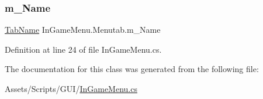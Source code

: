 \subsubsection{\texorpdfstring{m\+\_\+\+Name}{m\_Name}}
{\footnotesize\ttfamily \mbox{\hyperlink{_in_game_menu_8cs_a87eb828d74fde9afa783aa42bfe61b96}{Tab\+Name}} In\+Game\+Menu.\+Menutab.\+m\+\_\+\+Name}



Definition at line 24 of file In\+Game\+Menu.\+cs.



The documentation for this class was generated from the following file\+:\begin{DoxyCompactItemize}
\item 
Assets/\+Scripts/\+G\+U\+I/\mbox{\hyperlink{_in_game_menu_8cs}{In\+Game\+Menu.\+cs}}\end{DoxyCompactItemize}
